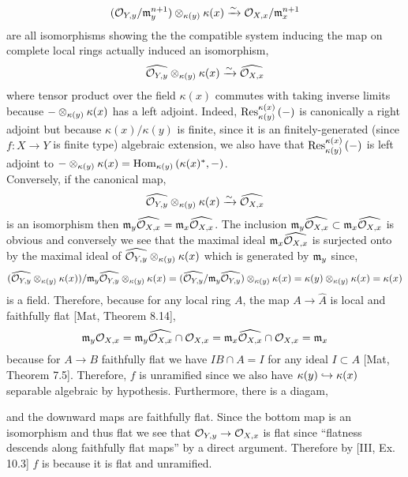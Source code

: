 \documentclass[12pt]{article}
\begin{document}
\[ (\mathcal{O}_{Y, y} / \mathfrak{m}_y^{n+1}) \otimes_{\kappa(y)} \kappa(x) \xrightarrow{\sim} \mathcal{O}_{X, x} / \mathfrak{m}_x^{n+1} \] 
are all isomorphisms showing the the compatible system inducing the map on complete local rings actually induced an isomorphism,
\[ \widehat{\mathcal{O}_{Y, y}} \otimes_{\kappa(y)} \kappa(x) \xrightarrow{\sim} \widehat{\mathcal{O}_{X, x}} \]
where tensor product over the field $\kappa(x)$ commutes with taking inverse limits because $- \otimes_{\kappa(y)} \kappa(x)$ has a left adjoint. Indeed, $\mathrm{Res}^{\kappa(x)}_{\kappa(y)} \left( - \right)$ is canonically a right adjoint but because $\kappa(x) / \kappa(y)$ is finite, since it is an finitely-generated (since $f : X \to Y$ is finite type) algebraic extension, we also have that $\mathrm{Res}^{\kappa(x)}_{\kappa(y)} \left( - \right)$ is left adjoint to $- \otimes_{\kappa(y)} \kappa(x) = \mathrm{Hom}_{\kappa(y)} \left( \kappa(x)^*, - \right)$.
\bigskip\\
Conversely, if the canonical map,
\[ \widehat{\mathcal{O}_{Y, y}} \otimes_{\kappa(y)} \kappa(x) \xrightarrow{\sim} \widehat{\mathcal{O}_{X, x}} \]
is an isomorphism then $\mathfrak{m}_y \widehat{\mathcal{O}_{X, x}} = \mathfrak{m}_x \widehat{\mathcal{O}_{X, x}}$. The inclusion $\mathfrak{m}_y \widehat{\mathcal{O}_{X, x}} \subset \mathfrak{m}_x \widehat{\mathcal{O}_{X, x}}$ is obvious and conversely we see that the maximal ideal $\mathfrak{m}_x \widehat{\mathcal{O}_{X, x}}$ is surjected onto by the maximal ideal of $\widehat{\mathcal{O}_{Y, y}} \otimes_{\kappa(y)} \kappa(x)$ which is generated by $\mathfrak{m}_y$ since,
\[ (\widehat{\mathcal{O}_{Y, y}} \otimes_{\kappa(y)} \kappa(x))/\mathfrak{m}_y \widehat{\mathcal{O}_{Y, y}} \otimes_{\kappa(y)} \kappa(x) = (\widehat{\mathcal{O}_{Y, y}} / \mathfrak{m}_y \widehat{\mathcal{O}_{Y, y}}) \otimes_{\kappa(y)} \kappa(x) = \kappa(y) \otimes_{\kappa(y)} \kappa(x) = \kappa(x) \]
is a field. Therefore, because for any local ring $A$, the map $A \to \hat{A}$ is local and faithfully flat [Mat, Theorem 8.14],
\[ \mathfrak{m}_y \mathcal{O}_{X, x} = \mathfrak{m}_y \widehat{\mathcal{O}_{X, x}} \cap \mathcal{O}_{X, x} = \mathfrak{m}_x \widehat{\mathcal{O}_{X, x}} \cap \mathcal{O}_{X, x} = \mathfrak{m}_x \]
because for $A \to B$ faithfully flat we have $I B \cap A = I$ for any ideal $I \subset A$ [Mat, Theorem 7.5]. 
Therefore, $f$ is unramified since we also have $\kappa(y) \hookrightarrow \kappa(x)$ separable algebraic by hypothesis.
Furthermore, there is a diagam, 
\begin{center}
\end{center}
and the downward maps are faithfully flat. Since the bottom map is an isomorphism and thus flat we see that $\mathcal{O}_{Y, y} \to \mathcal{O}_{X, x}$ is flat since ``flatness descends along faithfully flat maps'' by a direct argument. Therefore by [III, Ex. 10.3] $f$ is \etale because it is flat and unramified.
\end{document}
